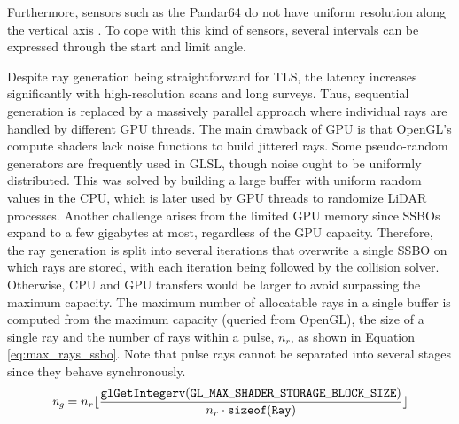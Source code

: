Furthermore, sensors such as the Pandar64 do not have uniform resolution along the vertical axis \cite{hesai_pandaset_2021}. To cope with this kind of sensors, several intervals can be expressed through the start and limit angle.  

Despite ray generation being straightforward for TLS, the latency increases significantly with high-resolution scans and long surveys. Thus, sequential generation is replaced by a massively parallel approach where individual rays are handled by different GPU threads. The main drawback of GPU is that OpenGL's compute shaders lack noise functions to build jittered rays. Some pseudo-random generators are frequently used in GLSL, though noise ought to be uniformly distributed. This was solved by building a large buffer with uniform random values in the CPU, which is later used by GPU threads to randomize LiDAR processes. Another challenge arises from the limited GPU memory since SSBOs expand to a few gigabytes at most, regardless of the GPU capacity. Therefore, the ray generation is split into several iterations that overwrite a single SSBO on which rays are stored, with each iteration being followed by the collision solver. Otherwise, CPU and GPU transfers would be larger to avoid surpassing the maximum capacity. The maximum number of allocatable rays in a single buffer is computed from the maximum capacity (queried from OpenGL), the size of a single ray and the number of rays within a pulse, $n_r$, as shown in Equation \ref{eq:max_rays_ssbo}. Note that pulse rays cannot be separated into several stages since they behave synchronously.
\begin{equation}
    \label{eq:max_rays_ssbo}   
    \textit{n}_{\textit{g}} = n_r\lfloor{\frac{\mathtt{\tiny{glGetIntegerv(GL\_MAX\_SHADER\_STORAGE\_BLOCK\_SIZE)}}}{n_r \cdot \tiny{\mathtt{sizeof(Ray)}}}\rfloor}
\end{equation}

